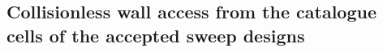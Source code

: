 %
%
\subsection{Collisionless wall access from the catalogue cells of the accepted sweep designs}
\label{sec:wall-loss-geometry-screening-v2-screening}

